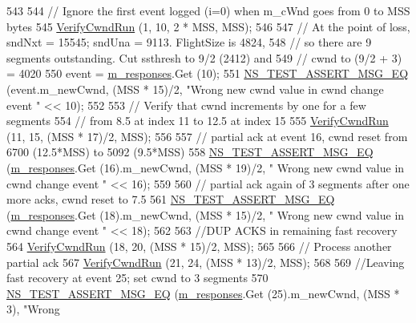 \begin{DoxyCode}
543 
544   \textcolor{comment}{// Ignore the first event logged (i=0) when m\_cWnd goes from 0 to MSS bytes}
545   \hyperlink{classNs3TcpCwndTestCase2_af24f479c923a480f751187f05bda69d1}{VerifyCwndRun} (1, 10, 2 * MSS, MSS);
546   
547   \textcolor{comment}{// At the point of loss, sndNxt = 15545; sndUna = 9113.  FlightSize is 4824, }
548   \textcolor{comment}{// so there are 9 segments outstanding.  Cut ssthresh to 9/2 (2412) and }
549   \textcolor{comment}{// cwnd to (9/2 + 3) = 4020}
550   \textcolor{keyword}{event} = \hyperlink{classNs3TcpCwndTestCase2_ab2e45e18596ca237cd979daccdcf65b2}{m\_responses}.Get (10);
551   \hyperlink{group__testing_ga2a9d78cffb3db8e867c35fff0b698cf5}{NS\_TEST\_ASSERT\_MSG\_EQ} (event.m\_newCwnd, (MSS * 15)/2, \textcolor{stringliteral}{"Wrong new cwnd value in cwnd
       change event "} << 10);
552 
553   \textcolor{comment}{// Verify that cwnd increments by one for a few segments}
554   \textcolor{comment}{// from 8.5 at index 11 to 12.5 at index 15}
555   \hyperlink{classNs3TcpCwndTestCase2_af24f479c923a480f751187f05bda69d1}{VerifyCwndRun} (11, 15, (MSS * 17)/2, MSS);
556 
557   \textcolor{comment}{// partial ack at event 16, cwnd reset from 6700 (12.5*MSS) to 5092 (9.5*MSS)}
558   \hyperlink{group__testing_ga2a9d78cffb3db8e867c35fff0b698cf5}{NS\_TEST\_ASSERT\_MSG\_EQ} (\hyperlink{classNs3TcpCwndTestCase2_ab2e45e18596ca237cd979daccdcf65b2}{m\_responses}.Get (16).m\_newCwnd, (MSS * 19)/2, \textcolor{stringliteral}{"
      Wrong new cwnd value in cwnd change event "} << 16);
559 
560   \textcolor{comment}{// partial ack again of 3 segments after one more acks, cwnd reset to 7.5 }
561   \hyperlink{group__testing_ga2a9d78cffb3db8e867c35fff0b698cf5}{NS\_TEST\_ASSERT\_MSG\_EQ} (\hyperlink{classNs3TcpCwndTestCase2_ab2e45e18596ca237cd979daccdcf65b2}{m\_responses}.Get (18).m\_newCwnd, (MSS * 15)/2, \textcolor{stringliteral}{"
      Wrong new cwnd value in cwnd change event "} << 18);
562 
563   \textcolor{comment}{//DUP ACKS in remaining fast recovery}
564   \hyperlink{classNs3TcpCwndTestCase2_af24f479c923a480f751187f05bda69d1}{VerifyCwndRun} (18, 20, (MSS * 15)/2, MSS);
565 
566   \textcolor{comment}{// Process another partial ack}
567   \hyperlink{classNs3TcpCwndTestCase2_af24f479c923a480f751187f05bda69d1}{VerifyCwndRun} (21, 24, (MSS * 13)/2, MSS);
568  
569   \textcolor{comment}{//Leaving fast recovery at event 25; set cwnd to 3 segments}
570   \hyperlink{group__testing_ga2a9d78cffb3db8e867c35fff0b698cf5}{NS\_TEST\_ASSERT\_MSG\_EQ} (\hyperlink{classNs3TcpCwndTestCase2_ab2e45e18596ca237cd979daccdcf65b2}{m\_responses}.Get (25).m\_newCwnd,  (MSS * 3), \textcolor{stringliteral}{"Wrong
}
\end{DoxyCode}
